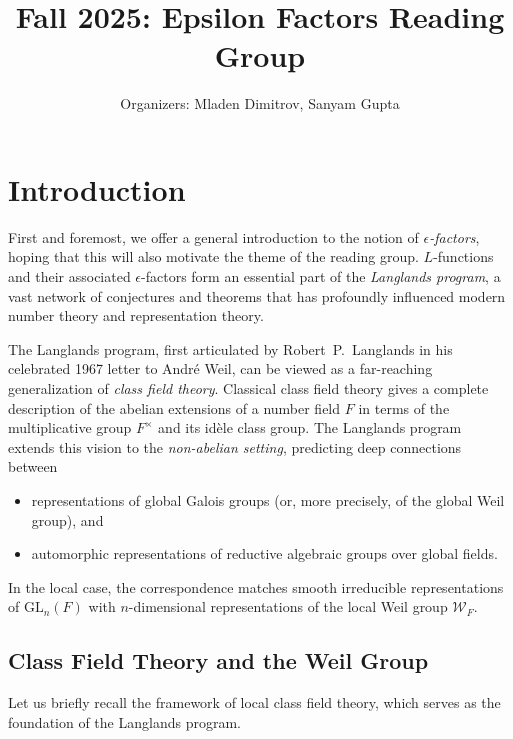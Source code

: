 \documentclass[11pt]{amsart}
\title{Fall 2025: Epsilon Factors Reading Group}
\author{Organizers: Mladen Dimitrov, Sanyam Gupta}
\begin{document}
\maketitle
\tableofcontents

\section{Introduction}
First and foremost, we offer a general introduction to the notion of
\emph{$\epsilon$-factors}, hoping that this will also motivate the theme of the
reading group.  $L$-functions and their associated $\epsilon$-factors form an
essential part of the \emph{Langlands program}, a vast network of conjectures
and theorems that has profoundly influenced modern number theory and
representation theory.

The Langlands program, first articulated by Robert~P.\ Langlands in his
celebrated 1967 letter to André Weil, can be viewed as a far-reaching
generalization of \emph{class field theory}.  Classical class field theory
gives a complete description of the abelian extensions of a number field
$F$ in terms of the multiplicative group $F^\times$ and its idèle class
group.  The Langlands program extends this vision to the
\emph{non-abelian setting}, predicting deep connections between
\begin{itemize}
    \item representations of global Galois groups (or, more precisely,
          of the global Weil group), and
    \item automorphic representations of reductive algebraic groups over
          global fields.
\end{itemize}

In the local case, the correspondence matches smooth irreducible
representations of $\mathrm{GL}_n(F)$ with $n$-dimensional representations of
the local Weil group $\mathcal W_F$.

\bigskip

\subsection{Class Field Theory and the Weil Group}

Let us briefly recall the framework of local class field theory, which serves as 
the foundation of the Langlands program.
\end{document}
